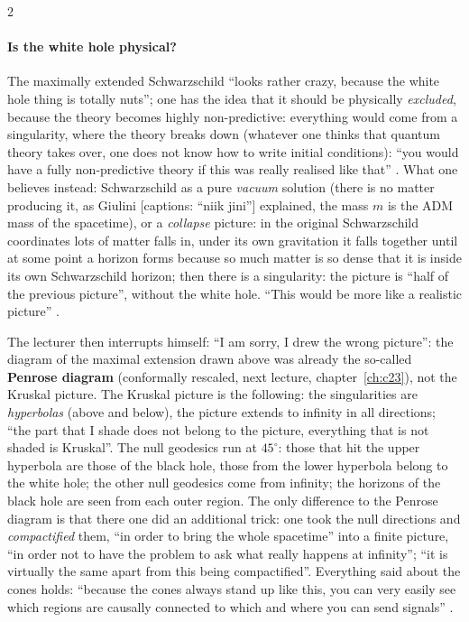 \begin{paracol}{2}
\paragraph{Is the white hole physical?} The maximally extended Schwarzschild ``looks rather crazy, because the white hole thing is totally nuts''; one has the idea that it should be physically \emph{excluded}, because the theory becomes highly non-predictive: everything would come from a singularity, where the theory breaks down (whatever one thinks that quantum theory takes over, one does not know how to write initial conditions): ``you would have a fully non-predictive theory if this was really realised like that'' . What one believes instead: Schwarzschild as a pure \emph{vacuum} solution (there is no matter producing it, as Giulini [captions: ``niik jini''] explained, the mass $m$ is the ADM mass of the spacetime), or a \emph{collapse} picture: in the original Schwarzschild coordinates lots of matter falls in, under its own gravitation it falls together until at some point a horizon forms because so much matter is so dense that it is inside its own Schwarzschild horizon; then there is a singularity: the picture is ``half of the previous picture'', without the white hole. ``This would be more like a realistic picture'' .

\begin{coursenote}
The lecturer then interrupts himself: ``I am sorry, I drew the wrong picture'': the diagram of the maximal extension drawn above was already the so-called \textbf{Penrose diagram} (conformally rescaled, next lecture, chapter~\ref{ch:c23}), not the Kruskal picture. The Kruskal picture is the following: the singularities are \emph{hyperbolas} (above and below), the picture extends to infinity in all directions; ``the part that I shade does not belong to the picture, everything that is not shaded is Kruskal''. The null geodesics run at $45^\circ$: those that hit the upper hyperbola are those of the black hole, those from the lower hyperbola belong to the white hole; the other null geodesics come from infinity; the horizons of the black hole are seen from each outer region. The only difference to the Penrose diagram is that there one did an additional trick: one took the null directions and \emph{compactified} them, ``in order to bring the whole spacetime'' into a finite picture, ``in order not to have the problem to ask what really happens at infinity''; ``it is virtually the same apart from this being compactified''. Everything said about the cones holds: ``because the cones always stand up like this, you can very easily see which regions are causally connected to which and where you can send signals'' .
\end{coursenote}


\end{paracol}
